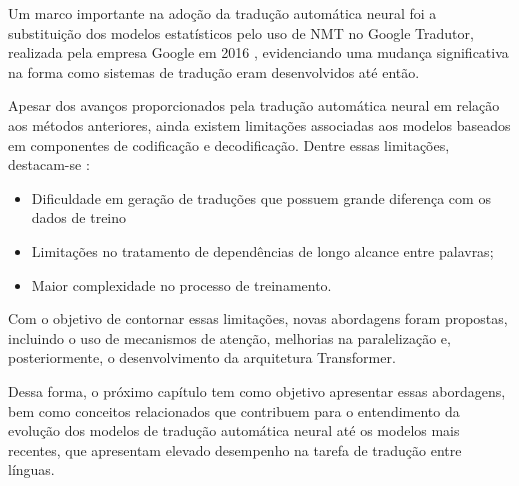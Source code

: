 Um marco importante na adoção da tradução automática neural foi a substituição dos modelos estatísticos pelo uso de NMT no Google Tradutor, realizada pela empresa Google em 2016 \cite{schuster2016zeroshot}, evidenciando uma mudança significativa na forma como sistemas de tradução eram desenvolvidos até então.

Apesar dos avanços proporcionados pela tradução automática neural em relação aos métodos anteriores, ainda existem limitações associadas aos modelos baseados em componentes de codificação e decodificação. Dentre essas limitações, destacam-se \cite{DBLP:journals/corr/abs-1709-07809,DBLP:journals/corr/VaswaniSPUJGKP17}:

\begin{itemize}
    \item Dificuldade em geração de traduções que possuem grande diferença com os dados de treino
    \item Limitações no tratamento de dependências de longo alcance entre palavras;
    \item Maior complexidade no processo de treinamento.
\end{itemize}


Com o objetivo de contornar essas limitações, novas abordagens foram propostas, incluindo o uso de mecanismos de atenção, melhorias na paralelização e, posteriormente, o desenvolvimento da arquitetura Transformer.\cite{DBLP:journals/corr/VaswaniSPUJGKP17} 

Dessa forma, o próximo capítulo tem como objetivo apresentar essas abordagens, bem como conceitos relacionados que contribuem para o entendimento da evolução dos modelos de tradução automática neural até os modelos mais recentes, que apresentam elevado desempenho na tarefa de tradução entre línguas.



